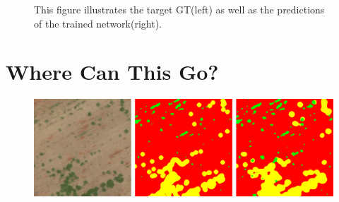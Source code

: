 \documentclass[
    ,title     = {{Image Segmentation for Smart Agriculture}}
    ,subject   = {{This is the subject of my work}}
    ,papersize = {{a1paper}}
    ,nocrop
]{dtuposter}
\begin{document}
\begin{dtupostercontent}
\begin{figure}
	\centering
{}
\caption{This figure illustrates the target GT(left) as well as the predictions of the trained network(right).}\label{fig:example}
\end{figure}



\section{Where Can This Go?}

\begin{figure}
	\begin{center}
			\includegraphics[width=\linewidth,origin=c]{reconst}
	\end{center}
\end{figure}


\end{dtupostercontent}
\end{document}
